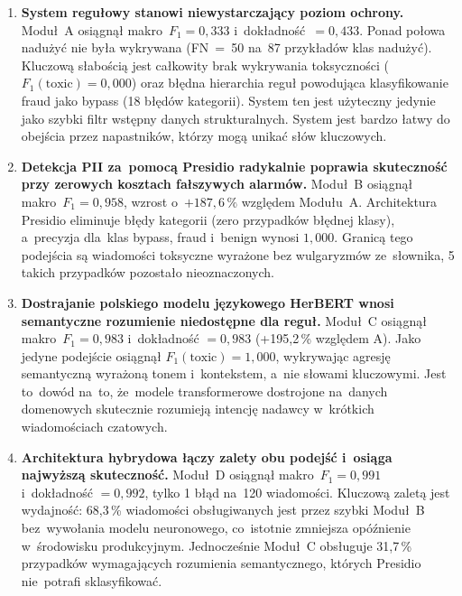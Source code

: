 \begin{enumerate}
  \item \textbf{System regułowy stanowi niewystarczający poziom ochrony.}
    Moduł~A osiągnął makro~$F_1 = 0{,}333$ i~dokładność~$= 0{,}433$.
    Ponad połowa nadużyć nie była wykrywana (FN~=~50 na~87 przykładów
    klas nadużyć). Kluczową słabością jest całkowity brak wykrywania
    toksyczności ($F_1(\text{toxic}) = 0{,}000$) oraz błędna hierarchia reguł
    powodująca klasyfikowanie fraud jako bypass (18 błędów kategorii).
    System ten jest użyteczny jedynie jako szybki filtr wstępny danych strukturalnych.
    System jest bardzo łatwy do obejścia przez napastników, którzy mogą unikać słów kluczowych.

  \item \textbf{Detekcja PII za~pomocą Presidio radykalnie poprawia skuteczność
    przy zerowych kosztach fałszywych alarmów.}
    Moduł~B osiągnął makro~$F_1 = 0{,}958$, wzrost o~$+187{,}6\,\%$ względem
    Modułu~A. Architektura Presidio eliminuje błędy
    kategorii (zero przypadków błędnej klasy), a~precyzja dla~klas bypass,
    fraud i~benign wynosi $1{,}000$. Granicą tego podejścia są wiadomości
    toksyczne wyrażone bez wulgaryzmów ze~słownika, 5 takich przypadków
    pozostało nieoznaczonych.

  \item \textbf{Dostrajanie polskiego modelu językowego HerBERT wnosi
    semantyczne rozumienie niedostępne dla reguł.}
    Moduł~C osiągnął makro~$F_1 = 0{,}983$ i~dokładność $= 0{,}983$
    (+195{,}2\,\% względem A). Jako jedyne podejście osiągnął
    $F_1(\text{toxic}) = 1{,}000$, wykrywając agresję semantyczną wyrażoną
    tonem i~kontekstem, a~nie słowami kluczowymi. Jest to~dowód na~to, że~modele
    transformerowe dostrojone na~danych domenowych skutecznie rozumieją
    intencję nadawcy w~krótkich wiadomościach czatowych.

  \item \textbf{Architektura hybrydowa łączy zalety obu podejść
    i~osiąga najwyższą skuteczność.}
    Moduł~D osiągnął makro~$F_1 = 0{,}991$ i~dokładność $= 0{,}992$,
    tylko 1 błąd na~120 wiadomości. Kluczową zaletą jest wydajność:
    68{,}3\,\% wiadomości obsługiwanych jest przez szybki Moduł~B
    bez~wywołania modelu neuronowego, co~istotnie zmniejsza opóźnienie
    w~środowisku produkcyjnym. Jednocześnie Moduł~C obsługuje 31{,}7\,\%
    przypadków wymagających rozumienia semantycznego, których Presidio
    nie~potrafi sklasyfikować.


\end{enumerate}
